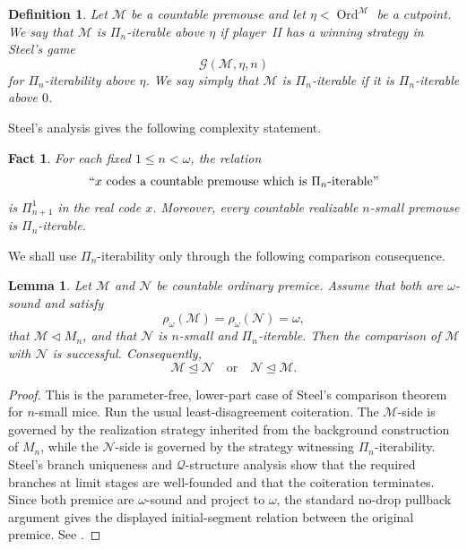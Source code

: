 \documentclass[a4paper,11pt]{article}
\newtheorem{lemma}[theorem]{Lemma}
\newtheorem{definition}[theorem]{Definition}
\newtheorem{fact}[theorem]{Fact}
\begin{document}
\begin{definition}
\label{definition-Steel-Pin-iterability}
Let $\mathcal M$ be a countable premouse and let
$\eta<\operatorname{Ord}^{\mathcal M}$ be a cutpoint.  We say that
$\mathcal M$ is \emph{$\Pi_n$-iterable above $\eta$} if player~II has a
winning strategy in Steel's game
\[
   \mathcal G(\mathcal M,\eta,n)
\]
for $\Pi_n$-iterability above $\eta$.  We say simply that $\mathcal M$ is
\emph{$\Pi_n$-iterable} if it is $\Pi_n$-iterable above $0$.
\end{definition}
Steel's analysis gives the following complexity statement.

\begin{fact}
\label{fact-projective-complexity-Pin-iterability}
For each fixed $1\leq n<\omega$, the relation
\[
   ``x\text{ codes a countable premouse which is }
   \Pi_n\text{-iterable}"
\]
is $\Pi^1_{n+1}$ in the real code $x$.  Moreover, every countable realizable
$n$-small premouse is $\Pi_n$-iterable.
\end{fact}

We shall use $\Pi_n$-iterability only through the following comparison
consequence.

\begin{lemma}
\label{lemma-comparison-with-Pin-iterable-premouse}
Let $\mathcal M$ and $\mathcal N$ be countable ordinary premice.  Assume that
both are $\omega$-sound and satisfy
\[
   \rho_\omega(\mathcal M)=\rho_\omega(\mathcal N)=\omega,
\]
that $\mathcal M\triangleleft M_n$, and that $\mathcal N$ is $n$-small and
$\Pi_n$-iterable.  Then the comparison of $\mathcal M$ with $\mathcal N$ is
successful.  Consequently,
\[
   \mathcal M\trianglelefteq\mathcal N
   \quad\text{or}\quad
   \mathcal N\trianglelefteq\mathcal M.
\]
\end{lemma}

\begin{proof}
This is the parameter-free, lower-part case of Steel's comparison theorem for
$n$-small mice.  Run the usual least-disagreement coiteration.  The
$\mathcal M$-side is governed by the realization strategy inherited from the
background construction of $M_n$, while the $\mathcal N$-side is governed by
the strategy witnessing $\Pi_n$-iterability.  Steel's branch uniqueness and
$\mathcal Q$-structure analysis show that the required branches at limit
stages are well-founded and that the coiteration terminates.  Since both
premice are $\omega$-sound and project to $\omega$, the standard no-drop
pullback argument gives the displayed initial-segment relation between the
original premice.  See \cite{Steel2,Steel3}.
\end{proof}
\end{document}
